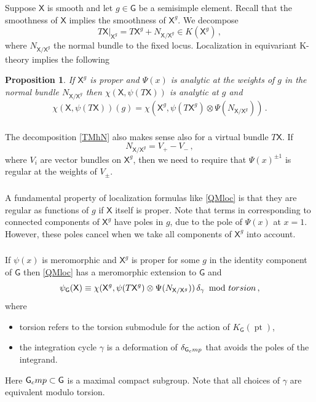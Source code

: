 \documentclass[14pt]{extarticle}
\newcommand{\bG}{\mathsf{G}}
\newcommand{\bX}{\mathsf{X}}
\newcommand{\comp}{\textup{cmp}}
\DeclareMathOperator{\pt}{pt}
\newtheorem{Proposition}[Lemma]{Proposition}
\theoremstyle{definition}
\begin{document}
Suppose $\bX$ is smooth and let $g\in \bG$ be a semisimple element. Recall that
the smoothness of $\bX$ implies the smoothness of $\bX^g$. We decompose
%
\begin{equation}
T\bX\big|_{\bX^g} = T\bX^g + N_{\bX/\bX^g}\in K(\bX^g) \label{TMhN}\,, 
\end{equation}
%
where 
$N_{\bX/\bX^g}$ the normal bundle to the fixed locus. Localization in equivariant K-theory implies the following

\begin{Proposition}
  If $\bX^g$ is proper and $\Psi(x)$ is analytic at the weights
  of $g$ in the normal bundle $N_{\bX/\bX^g}$ then $\chi(\bX,\psi(T\bX))$ is analytic at $g$ and 
%
\begin{equation}
  \label{QMloc}
  \chi(\bX, \psi(T\bX))(g) = \chi(\bX^g, \psi(T \bX^g) \otimes \Psi(N_{\bX/\bX^g}))\,. 
\end{equation}
%
\end{Proposition}

\subsubsection{} 
The decomposition \eqref{TMhN} also 
  makes sense also for a virtual bundle $T\bX$. If
  \[
    N_{\bX/\bX^g} = V_+ - V_-\,,
  \]
  where $V_i$ are vector bundles on $\bX^g$, then we need to require
  that $\Psi(x)^{\pm 1}$ is regular at the weights of $V_\pm$. 
  




\subsubsection{}
A fundamental property of localization formulas like \eqref{QMloc} is
that they are regular as functions of $g$ if $\bX$ itself is proper.
Note that terms in corresponding to connected components of $\bX^g$ have
poles in $g$, due to the pole of $\Psi(x)$ at $x=1$. However, these
poles cancel when we take all components of $\bX^g$ into account.

\subsubsection{}\label{s_C}
If $\psi(x)$ is meromorphic and $\bX^g$ is proper for some $g$ in the identity
component of $\bG$ then \eqref{QMloc} has a meromorphic extension to
$\bG$ and 
%
\begin{equation}
  \label{eq:49}
  \psi_\bG(\bX) \equiv \chi(\bX^g, \psi(T \bX^g) \otimes
  \Psi(N_{\bX/\bX^g})) \, 
   \delta_\gamma \! \mod \textup{torsion} \,, 
\end{equation}
%
where
%
\begin{itemize}
\item[$\bullet$] torsion refers to the torsion submodule for the action of
  $K_\bG(\pt)$,
\item[$\bullet$] the integration cycle $\gamma$ is a deformation of
$\delta_{\bG_\comp}$ 
that avoids the poles of the
integrand.
\end{itemize}
Here $\bG_\comp \subset \bG$ is a maximal compact
subgroup. 
Note that all choices of $\gamma$ are equivalent modulo
torsion.
\end{document}
